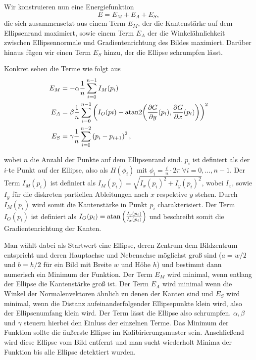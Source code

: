 Wir konstruieren nun eine Energiefunktion
\[
	E = E_M + E_A + E_S,
\]
die sich zusammensetzt aus einem Term $E_M$, der die Kantenstärke auf dem Ellipsenrand maximiert, sowie einem Term $E_A$ der die Winkelähnlichkeit zwischen Ellipsennormale und Gradientenrichtung des Bildes maximiert. Darüber hinaus fügen wir einen Term $E_S$ hinzu, der die Ellipse schrumpfen lässt.

Konkret sehen die Terme wie folgt aus
\begin{equation}\label{eq:deformTerms}
	\begin{aligned}
		E_M &= -\alpha\frac{1}{n}\sum_{i=0}^{n-1}I_M(p_i) \\
		E_A &= \beta\frac{1}{n}\sum_{i=0}^{n-1}\left(I_O(pi) - \text{atan2}{\left(\frac{\partial G}{\partial y}(p_i), \frac{\partial G}{\partial x}(p_i)\right)}\right)^2 \\
		E_S &= \gamma\frac{1}{n}\sum_{i=0}^{n-2}\left(p_i - p_{i+1}\right)^2,
	\end{aligned}
\end{equation}

wobei $n$ die Anzahl der Punkte auf dem Ellipsenrand sind. $p_i$ ist definiert als der $i$-te Punkt auf der Ellipse, also als $H(\phi_i)$ mit $\phi_i = \frac{i}{n}\cdot2\pi ~\forall i = 0,\dotsc,n-1$.
Der Term $I_M(p_i)$ ist definiert als $I_M(p_i) = \sqrt{I_x(p_i)^2 + I_y(p_i)^2}$, wobei $I_x$, sowie $I_y$ für die diskreten partiellen Ableitungen nach $x$ respektive $y$ stehen. Durch $I_M(p_i)$ wird somit die Kantenstärke in Punkt $p_i$ charakterisiert. Der Term $I_O(p_i)$ ist definiert als $I_O(p_i) = \text{atan}\left(\frac{I_y(p_i)}{I_x(p_i)}\right)$
und beschreibt somit die Gradientenrichtung der Kanten.

Man wählt dabei als Startwert eine Ellipse, deren Zentrum dem Bildzentrum entspricht und deren Hauptachse und Nebenachse möglichst groß sind ($a = w/2$ und $b = h/2$ für ein Bild mit Breite $w$ und Höhe $h$) und bestimmt dann numerisch ein Minimum der Funktion. Der Term $E_M$ wird minimal, wenn entlang der Ellipse die Kantenstärke groß ist. Der Term $E_A$ wird minimal wenn die Winkel der Normalenvektoren ähnlich zu denen der Kanten sind und $E_S$ wird minimal, wenn die Distanz aufeinanderfolgender Ellipsepunkte klein wird, also der Ellipsenumfang klein wird. Der Term lässt die Ellipse also schrumpfen. $\alpha, \beta$ und $\gamma$ steuern hierbei den Einluss der einzelnen Terme. Das Minimum der Funktion sollte die äußerste Ellipse im Kalibirierungsmuster sein. Anschließend wird diese Ellipse vom Bild entfernt und man sucht wiederholt Minima der Funktion bis alle Ellipse detektiert wurden.




